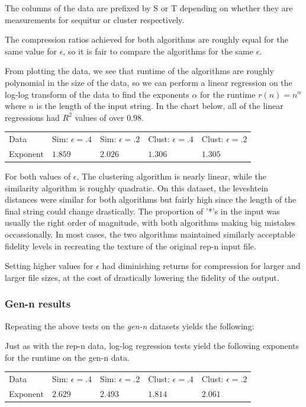 \documentclass[11pt]{article}
\begin{document}
The columns of the data are prefixed by S or T depending on whether
they are measurements for sequitur or cluster respectively.

The compression ratios achieved for both algorithms are roughly equal for the same
value for $\epsilon$, so it is fair to compare the algorithms for the same $\epsilon$.


From plotting the data, we see that runtime of the algorithms are roughly polynomial
in the size of the data, so we can perform a linear regression on the log-log transform
of the data to find the exponents $\alpha$ for the runtime $r(n)=n^\alpha$ where $n$ is the
length of the input string. In the chart below, all of the linear regressions had
$R^2$ values of over $0.98$.

\begin{tabular}{l|l|l|l|l}
Data     & Sim: $\epsilon=.4$ & Sim: $\epsilon=.2$ & Clust: $\epsilon = .4$ & Clust: $\epsilon = .2$ \\
Exponent & $1.859$ & $2.026$ & $1.306$ & $1.305$
\end{tabular}


For both values of $\epsilon$, 
The clustering algorithm is nearly linear, while the similarity algorithm is roughly
quadratic. On this dataset, the leveshtein distances were similar for both algorithms
but fairly high since the length of the final string could change drastically.
The proportion of '*'s in the input was usually the right order of magnitude,
with both algorithms making big mistakes occassionally. In most cases,
the two algorithms maintained similarly acceptable fidelity levels in recreating
the texture of the original rep-n input file.

Setting higher values for $\epsilon$ had diminishing returns for compression
for larger and larger file sizes, at the cost of drastically lowering the fidelity
of the output. 

\subsubsection{Gen-n results}

Repeating the above tests on the \emph{gen-n} datasets yields the following:


Just as with the rep-n data, log-log regression tests yield the following
exponents for the runtime on the gen-n data.

\begin{tabular}{l|l|l|l|l}
Data     & Sim: $\epsilon=.4$ & Sim: $\epsilon=.2$ & Clust: $\epsilon = .4$ & Clust: $\epsilon = .2$ \\
Exponent & $2.629$ & $2.493$ & $1.814$ & $2.061$
\end{tabular}
\end{document}
